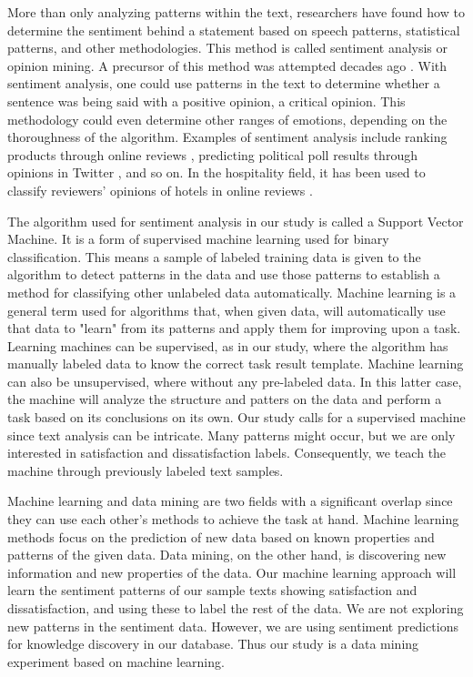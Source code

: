 \documentclass[smallextended,natbib]{svjour3}       %
\begin{document}
    More than only analyzing patterns within the text, researchers have found how to determine the sentiment behind a statement based on speech patterns, statistical patterns, and other methodologies. This method is called sentiment analysis or opinion mining. A precursor of this method was attempted decades ago \cite[][]{stone1966general}. With sentiment analysis, one could use patterns in the text to determine whether a sentence was being said with a positive opinion, a critical opinion. This methodology could even determine other ranges of emotions, depending on the thoroughness of the algorithm. Examples of sentiment analysis include ranking products through online reviews \cite[e.g][]{liu2017149, zhang2011}, predicting political poll results through opinions in Twitter \cite[][]{oconnor2010}, and so on. In the hospitality field, it has been used to classify reviewers' opinions of hotels in online reviews \cite[e.g.]{kim2017362, alsmadi2018}. 

    The algorithm used for sentiment analysis in our study is called a Support Vector Machine. It is a form of supervised machine learning used for binary classification. This means a sample of labeled training data is given to the algorithm to detect patterns in the data and use those patterns to establish a method for classifying other unlabeled data automatically. Machine learning is a general term used for algorithms that, when given data, will automatically use that data to "learn" from its patterns and apply them for improving upon a task. Learning machines can be supervised, as in our study, where the algorithm has manually labeled data to know the correct task result template. Machine learning can also be unsupervised, where without any pre-labeled data. In this latter case, the machine will analyze the structure and patters on the data and perform a task based on its conclusions on its own. Our study calls for a supervised machine since text analysis can be intricate. Many patterns might occur, but we are only interested in satisfaction and dissatisfaction labels. Consequently, we teach the machine through previously labeled text samples. 

    Machine learning and data mining are two fields with a significant overlap since they can use each other's methods to achieve the task at hand. Machine learning methods focus on the prediction of new data based on known properties and patterns of the given data. Data mining, on the other hand, is discovering new information and new properties of the data. Our machine learning approach will learn the sentiment patterns of our sample texts showing satisfaction and dissatisfaction, and using these to label the rest of the data. We are not exploring new patterns in the sentiment data. However, we are using sentiment predictions for knowledge discovery in our database. Thus our study is a data mining experiment based on machine learning.
\end{document}
